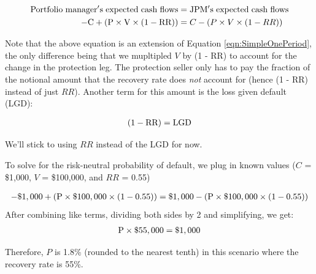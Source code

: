 \documentclass{jss}
\begin{document}
\label{eqn:recovery}
\begin{align}
  \rm Portfolio\hspace{3pt}manager's\hspace{3pt}expected\hspace{3pt}cash\hspace{3pt}flows &= \rm JPM's\hspace{3pt}expected\hspace{3pt}cash\hspace{3pt}flows \\
  \rm - C + (P \times V \times (1 - RR)) &= C - (P \times V \times (1 - RR))
\end{align}

Note that the above equation is an extension of Equation \ref{eqn:SimpleOnePeriod}, the only difference being that we mupltipled $V$ by (1 - RR) to account for the change in the protection leg. The protection seller only has to pay the fraction of the notional amount that the recovery rate does \emph{not} account for (hence (1 - RR) instead of just $RR$). Another term for this amount is the loss given default (LGD):

\begin{equation}
 \begin{aligned}
   {\rm (1 - RR) = LGD}
    \end{aligned}
\label{eqn:recovery}
\end{equation}

We'll stick to using $RR$ instead of the LGD for now.

To solve for the risk-neutral probability of default, we plug in known values ($C$ = \$1,000, $V$ = \$100,000, and $RR$ = 0.55)

\begin{equation}
 \begin{aligned}
   {\rm - \$1,000 + (P \times \$100,000 \times (1 - 0.55)) = \$1,000 - (P \times \$100,000 \times (1 - 0.55))}
    \end{aligned}
\end{equation}
After combining like terms, dividing both sides by 2 and simplifying, we get:
\begin{equation}
 \begin{aligned}
   {\rm P \times \$55,000 = \$1,000}
    \end{aligned}
\end{equation}

Therefore, $P$ is 1.8\% (rounded to the nearest tenth) in this scenario where the recovery rate is 55\%.
\end{document}
